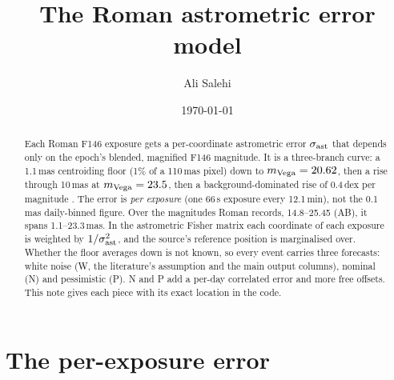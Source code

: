 \documentclass[english,10pt,a4paper]{article}
\title{The Roman astrometric error model}
\author{Ali Salehi}
\date{\today}
\begin{document}
\maketitle

\begin{abstract}
Each Roman F146 exposure gets a per-coordinate astrometric error $\sigma_{\rm ast}$ that depends
only on the epoch's blended, magnified F146 magnitude. It is a three-branch curve: a 1.1\,mas
centroiding floor (1\% of a 110\,mas pixel) down to $m_{\rm Vega}=20.62$, then a rise through
10\,mas at $m_{\rm Vega}=23.5$, then a background-dominated rise of 0.4\,dex per magnitude
\citep{Sanderson2019WFIRSTastrometry,Lam2026BHbinaries}. The error is \emph{per exposure}
(one 66\,s exposure every 12.1\,min), not the 0.1\,mas daily-binned figure. Over the magnitudes
Roman records, 14.8--25.45 (AB), it spans 1.1--23.3\,mas. In the astrometric Fisher matrix
each coordinate of each exposure is weighted by $1/\sigma_{\rm ast}^2$, and the source's reference
position is marginalised over. Whether the floor averages down is not known, so every event
carries three forecasts: white noise (W, the literature's assumption and the main output columns),
nominal (N) and pessimistic (P). N and P add a per-day correlated error and more free offsets.
This note gives each piece with its exact location in the code.
\end{abstract}

\section{The per-exposure error}
\label{sec:model}
\end{document}
